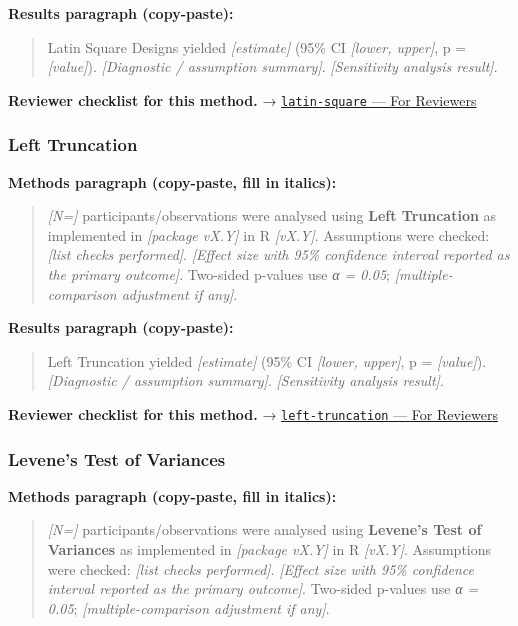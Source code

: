 \documentclass[
]{article}
\begin{document}
\textbf{Results paragraph (copy-paste):}

\begin{quote}
Latin Square Designs yielded \emph{{[}estimate{]}} (95\% CI
\emph{{[}lower, upper{]}}, p = \emph{{[}value{]}}). \emph{{[}Diagnostic
/ assumption summary{]}}. \emph{{[}Sensitivity analysis result{]}}.
\end{quote}

\textbf{Reviewer checklist for this method.} →
\href{../chapters/16-design/latin-square.Rmd\#for-reviewers}{\texttt{latin-square}
--- For Reviewers}

\subsubsection{Left Truncation}\label{left-truncation}

\textbf{Methods paragraph (copy-paste, fill in italics):}

\begin{quote}
\emph{{[}N={]}} participants/observations were analysed using
\textbf{Left Truncation} as implemented in \emph{{[}package vX.Y{]}} in
R \emph{{[}vX.Y{]}}. Assumptions were checked: \emph{{[}list checks
performed{]}}. \emph{{[}Effect size with 95\% confidence interval
reported as the primary outcome{]}}. Two-sided p-values use \emph{α =
0.05}; \emph{{[}multiple-comparison adjustment if any{]}}.
\end{quote}

\textbf{Results paragraph (copy-paste):}

\begin{quote}
Left Truncation yielded \emph{{[}estimate{]}} (95\% CI \emph{{[}lower,
upper{]}}, p = \emph{{[}value{]}}). \emph{{[}Diagnostic / assumption
summary{]}}. \emph{{[}Sensitivity analysis result{]}}.
\end{quote}

\textbf{Reviewer checklist for this method.} →
\href{../chapters/11-survival/left-truncation.Rmd\#for-reviewers}{\texttt{left-truncation}
--- For Reviewers}

\subsubsection{Levene's Test of
Variances}\label{levenes-test-of-variances}

\textbf{Methods paragraph (copy-paste, fill in italics):}

\begin{quote}
\emph{{[}N={]}} participants/observations were analysed using
\textbf{Levene's Test of Variances} as implemented in \emph{{[}package
vX.Y{]}} in R \emph{{[}vX.Y{]}}. Assumptions were checked: \emph{{[}list
checks performed{]}}. \emph{{[}Effect size with 95\% confidence interval
reported as the primary outcome{]}}. Two-sided p-values use \emph{α =
0.05}; \emph{{[}multiple-comparison adjustment if any{]}}.
\end{quote}
\end{document}
